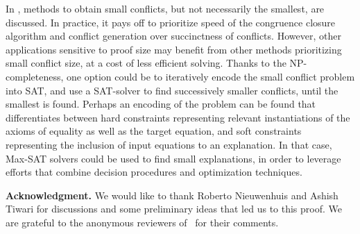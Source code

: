 \documentclass[smallextended]{svjour3}
\begin{document}
In \cite{Fontaine1,Nieuwenhuis3,Nieuwenhuis9}, methods to obtain small
conflicts, but not necessarily the smallest, are discussed.  In practice, it
pays off to prioritize speed of the congruence closure algorithm and conflict
generation over succinctness of conflicts.  However, other applications
sensitive to proof size may benefit from other methods prioritizing small
conflict size, at a cost of less efficient solving. Thanks to the
NP-completeness, one option could be to iteratively encode the small conflict
problem into SAT, and use a SAT-solver to find successively smaller conflicts,
until the smallest is found. 
Perhaps an encoding of the problem can be found that differentiates between hard constraints representing relevant instantiations of the axioms of equality as well as the target equation,
and soft constraints representing the inclusion of input equations to an explanation.
In that case, Max-SAT solvers could be used to find small explanations, 
in order to leverage efforts that combine decision procedures and optimization techniques. %

\vspace*{5pt}\noindent
{\bf Acknowledgment.} We would like to thank Roberto Nieuwenhuis and Ashish
Tiwari for discussions and some preliminary ideas that led us to this proof.
We are grateful to the anonymous reviewers of~\cite{Fellner1} for their comments.


%

\end{document}
